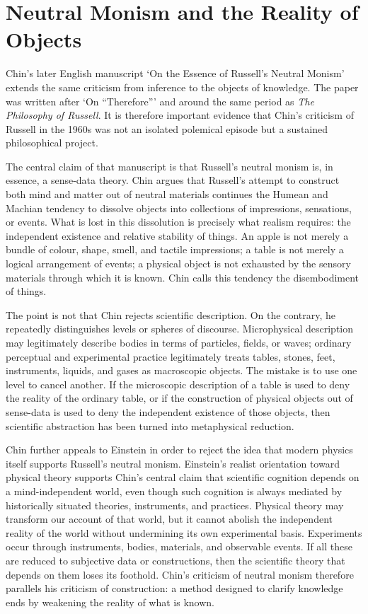 \documentclass{birkjour}
\begin{document}
\section{Neutral Monism and the Reality of Objects}

Chin's later English manuscript `On the Essence of Russell's Neutral Monism' extends the same criticism from inference to the objects of knowledge. The paper was written after `On ``Therefore''' and around the same period as \textit{The Philosophy of Russell}. It is therefore important evidence that Chin's criticism of Russell in the 1960s was not an isolated polemical episode but a sustained philosophical project.

The central claim of that manuscript is that Russell's neutral monism is, in essence, a sense-data theory. Chin argues that Russell's attempt to construct both mind and matter out of neutral materials continues the Humean and Machian tendency to dissolve objects into collections of impressions, sensations, or events. What is lost in this dissolution is precisely what realism requires: the independent existence and relative stability of things. An apple is not merely a bundle of colour, shape, smell, and tactile impressions; a table is not merely a logical arrangement of events; a physical object is not exhausted by the sensory materials through which it is known. Chin calls this tendency the disembodiment of things.

The point is not that Chin rejects scientific description. On the contrary, he repeatedly distinguishes levels or spheres of discourse. Microphysical description may legitimately describe bodies in terms of particles, fields, or waves; ordinary perceptual and experimental practice legitimately treats tables, stones, feet, instruments, liquids, and gases as macroscopic objects. The mistake is to use one level to cancel another. If the microscopic description of a table is used to deny the reality of the ordinary table, or if the construction of physical objects out of sense-data is used to deny the independent existence of those objects, then scientific abstraction has been turned into metaphysical reduction.

Chin further appeals to Einstein in order to reject the idea that modern physics itself supports Russell's neutral monism. Einstein's realist orientation toward physical theory supports Chin's central claim that scientific cognition depends on a mind-independent world, even though such cognition is always mediated by historically situated theories, instruments, and practices. Physical theory may transform our account of that world, but it cannot abolish the independent reality of the world without undermining its own experimental basis. Experiments occur through instruments, bodies, materials, and observable events. If all these are reduced to subjective data or constructions, then the scientific theory that depends on them loses its foothold. Chin's criticism of neutral monism therefore parallels his criticism of construction: a method designed to clarify knowledge ends by weakening the reality of what is known.
\end{document}
